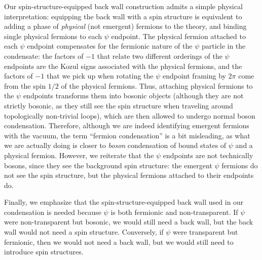 \documentclass[12pt,a4paper]{article}
\begin{document}
Our spin-structure-equipped back wall construction admits a simple physical interpretation: equipping the back wall with a spin structure is equivalent to adding a phase of {\it physical} (not emergent) fermions to the theory, and binding single physical fermions to each $\psi$ endpoint.
The physical fermion attached to each $\psi$ endpoint compensates for the fermionic nature of the $\psi$ particle in the condensate: the factors of $-1$ that relate two different orderings of the $\psi$ endpoints are the Kozul signs associated with the physical fermions, and the factors of $-1$ that we pick up when rotating the $\psi$ endpoint framing by $2\pi$ come from the spin $1/2$ of the physical fermions. 
Thus, attaching physical fermions to the $\psi$ endpoints transforms them into bosonic objects (although they are not strictly bosonic, as they still see the spin structure when traveling around topologically non-trivial loops), which are then allowed to undergo normal boson condensation. 
Therefore, although we are indeed identifying emergent fermions with the vacuum, the term ``fermion condensation'' is a bit misleading, as what we are actually doing is closer to {\it boson} condensation of bound states of $\psi$ and a physical fermion. 
However, we reiterate that the $\psi$ endpoints are not technically bosons, since they see the background spin structure: the emergent $\psi$ fermions do not see the spin structure, but the physical fermions attached to their endpoints do. 

Finally, we emphasize that the spin-structure-equipped back wall used in our condensation is needed because $\psi$ is both fermionic and non-transparent. If $\psi$ were non-transparent but bosonic, we would still need a back wall, but the back wall would not need a spin structure.
Conversely, if $\psi$ were transparent but fermionic, then we would not need a back wall, but we would still need to introduce spin
structures.
\end{document}
